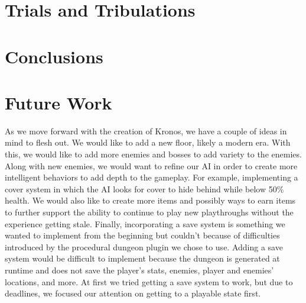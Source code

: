 \documentclass{sigchi}
\begin{document}
\section{Trials and Tribulations}

\section{Conclusions}

\section{Future Work}
As we move forward with the creation of Kronos, we have a couple of ideas in mind to flesh out. We would like to add a new floor, likely a modern era. With this, we would like to add more enemies and bosses to add variety to the enemies. Along with new enemies, we would want to refine our AI in order to create more intelligent behaviors to add depth to the gameplay. For example, implementing a cover system in which the AI looks for cover to hide behind while below 50\% health. We would also like to create more items and possibly ways to earn items to further support the ability to continue to play new playthroughs without the experience getting stale. Finally, incorporating a save system is something we wanted to implement from the beginning but couldn't because of difficulties introduced by the procedural dungeon plugin we chose to use. Adding a save system would be difficult to implement because the dungeon is generated at runtime and does not save the player's stats, enemies, player and enemies' locations, and more. At first we tried getting a save system to work, but due to deadlines, we focused our attention on getting to a playable state first.
\end{document}
